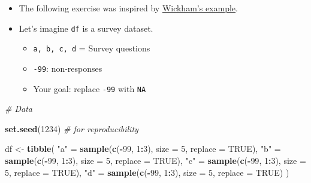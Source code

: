 \documentclass[
]{book}
\newenvironment{Shaded}{\begin{snugshade}}{\end{snugshade}}
\newcommand{\CommentTok}[1]{\textcolor[rgb]{0.56,0.35,0.01}{\textit{#1}}}
\newcommand{\DataTypeTok}[1]{\textcolor[rgb]{0.13,0.29,0.53}{#1}}
\newcommand{\DecValTok}[1]{\textcolor[rgb]{0.00,0.00,0.81}{#1}}
\newcommand{\KeywordTok}[1]{\textcolor[rgb]{0.13,0.29,0.53}{\textbf{#1}}}
\newcommand{\NormalTok}[1]{#1}
\newcommand{\OperatorTok}[1]{\textcolor[rgb]{0.81,0.36,0.00}{\textbf{#1}}}
\newcommand{\OtherTok}[1]{\textcolor[rgb]{0.56,0.35,0.01}{#1}}
\newcommand{\StringTok}[1]{\textcolor[rgb]{0.31,0.60,0.02}{#1}}
\begin{document}
\begin{itemize}
\item
  The following exercise was inspired by \href{http://adv-r.had.co.nz/Functional-programming.html}{Wickham's example}.
\item
  Let's imagine \texttt{df} is a survey dataset.

  \begin{itemize}
  \item
    \texttt{a,\ b,\ c,\ d} = Survey questions
  \item
    \texttt{-99}: non-responses
  \item
    Your goal: replace \texttt{-99} with \texttt{NA}
  \end{itemize}
\end{itemize}

\begin{Shaded}
\begin{Highlighting}[]
\CommentTok{\# Data}

\KeywordTok{set.seed}\NormalTok{(}\DecValTok{1234}\NormalTok{) }\CommentTok{\# for reproducibility}

\NormalTok{df \textless{}{-}}\StringTok{ }\KeywordTok{tibble}\NormalTok{(}
  \StringTok{"a"}\NormalTok{ =}\StringTok{ }\KeywordTok{sample}\NormalTok{(}\KeywordTok{c}\NormalTok{(}\OperatorTok{{-}}\DecValTok{99}\NormalTok{, }\DecValTok{1}\OperatorTok{:}\DecValTok{3}\NormalTok{), }\DataTypeTok{size =} \DecValTok{5}\NormalTok{, }\DataTypeTok{replace =} \OtherTok{TRUE}\NormalTok{),}
  \StringTok{"b"}\NormalTok{ =}\StringTok{ }\KeywordTok{sample}\NormalTok{(}\KeywordTok{c}\NormalTok{(}\OperatorTok{{-}}\DecValTok{99}\NormalTok{, }\DecValTok{1}\OperatorTok{:}\DecValTok{3}\NormalTok{), }\DataTypeTok{size =} \DecValTok{5}\NormalTok{, }\DataTypeTok{replace =} \OtherTok{TRUE}\NormalTok{),}
  \StringTok{"c"}\NormalTok{ =}\StringTok{ }\KeywordTok{sample}\NormalTok{(}\KeywordTok{c}\NormalTok{(}\OperatorTok{{-}}\DecValTok{99}\NormalTok{, }\DecValTok{1}\OperatorTok{:}\DecValTok{3}\NormalTok{), }\DataTypeTok{size =} \DecValTok{5}\NormalTok{, }\DataTypeTok{replace =} \OtherTok{TRUE}\NormalTok{),}
  \StringTok{"d"}\NormalTok{ =}\StringTok{ }\KeywordTok{sample}\NormalTok{(}\KeywordTok{c}\NormalTok{(}\OperatorTok{{-}}\DecValTok{99}\NormalTok{, }\DecValTok{1}\OperatorTok{:}\DecValTok{3}\NormalTok{), }\DataTypeTok{size =} \DecValTok{5}\NormalTok{, }\DataTypeTok{replace =} \OtherTok{TRUE}\NormalTok{)}
\NormalTok{)}
\end{Highlighting}
\end{Shaded}
\end{document}
